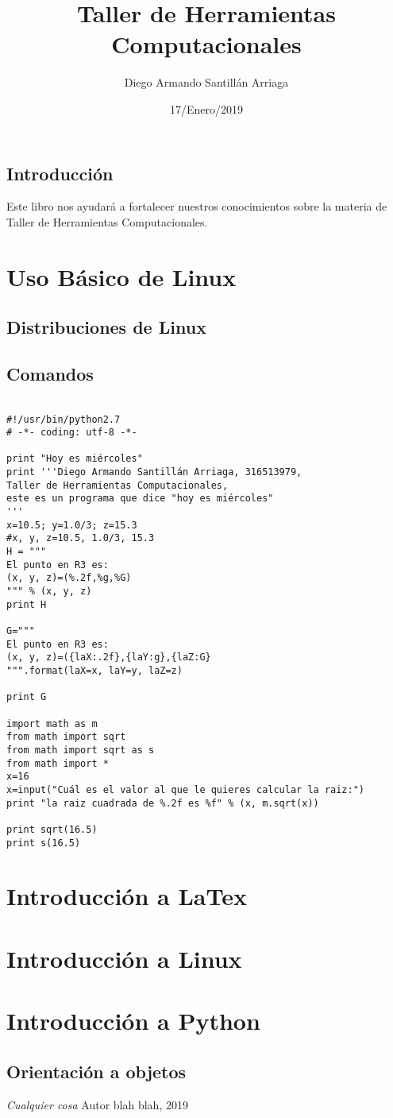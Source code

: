\documentclass{book}
\title{Taller de Herramientas Computacionales}
\author{Diego Armando Santillán Arriaga}
\date{17/Enero/2019}
\begin{document}
\maketitle
\tableofcontents
\section*{Introducción} Este libro nos ayudará a fortalecer nuestros conocimientos sobre la materia de Taller de Herramientas Computacionales. 
\chapter{Uso Básico de Linux}
\section{Distribuciones de Linux}
\section{Comandos}

\begin{verbatim}

#!/usr/bin/python2.7
# -*- coding: utf-8 -*-

print "Hoy es miércoles"
print '''Diego Armando Santillán Arriaga, 316513979,
Taller de Herramientas Computacionales,
este es un programa que dice "hoy es miércoles"
'''
x=10.5; y=1.0/3; z=15.3
#x, y, z=10.5, 1.0/3, 15.3
H = """
El punto en R3 es:
(x, y, z)=(%.2f,%g,%G)
""" % (x, y, z)
print H

G="""
El punto en R3 es:
(x, y, z)=({laX:.2f},{laY:g},{laZ:G}
""".format(laX=x, laY=y, laZ=z)

print G

import math as m
from math import sqrt
from math import sqrt as s
from math import *
x=16
x=input("Cuál es el valor al que le quieres calcular la raiz:")
print "la raiz cuadrada de %.2f es %f" % (x, m.sqrt(x))

print sqrt(16.5)
print s(16.5)

\end{verbatim}

\chapter{Introducción a LaTex}
\chapter{Introducción a Linux}
\chapter{Introducción a Python}
\section{Orientación a objetos}

\begin{thebibliography}{9}
	\textit{Cualquier cosa}
	Autor blah blah, 2019
\end{thebibliography}
\end{document}
